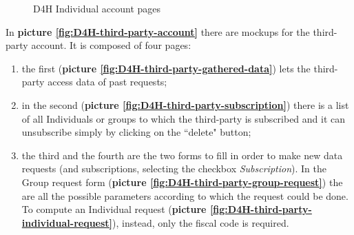 \begin{figure}[H]
  \centering
  
  \caption{D4H Individual account pages}
  \label{fig:D4H-individual-account}
\end{figure}

In \textbf{picture \ref{fig:D4H-third-party-account}} there are mockups for the third-party account. It is composed of four pages: 
\begin{enumerate}
    \item the first (\textbf{picture \ref{fig:D4H-third-party-gathered-data}}) lets the third-party access data of past requests; 
    \item in the second (\textbf{picture \ref{fig:D4H-third-party-subscription}}) there is a list of all Individuals or groups to which the third-party is subscribed and it can unsubscribe simply by clicking on the ``delete" button;
    \item the third and the fourth are the two forms to fill in order to make new data requests (and subscriptions, selecting the checkbox \emph{Subscription}). In the Group request form (\textbf{picture \ref{fig:D4H-third-party-group-request}}) the are all the possible parameters according to which the request could be done. To compute an Individual request (\textbf{picture \ref{fig:D4H-third-party-individual-request}}), instead, only the fiscal code is required.
\end{enumerate}


